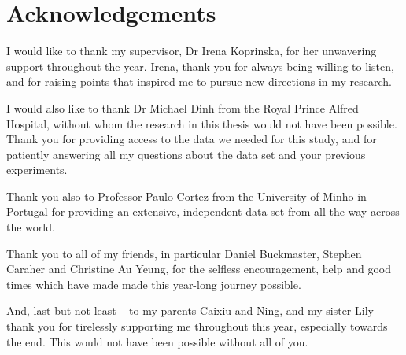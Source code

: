 \chapter*{Acknowledgements}

I would like to thank my supervisor, Dr Irena Koprinska, for her unwavering
support throughout the year. Irena, thank you for always being willing to
listen, and for raising points that inspired me to pursue new directions in
my research.

I would also like to thank Dr Michael Dinh from the Royal Prince Alfred
Hospital, without whom the research in this thesis would not have been
possible. Thank you for providing access to the data we needed for this study,
and for patiently answering all my questions about the data set and your
previous experiments.

Thank you also to Professor Paulo Cortez from the University of Minho in
Portugal for providing an extensive, independent data set from all the way
across the world.

Thank you to all of my friends, in particular Daniel Buckmaster, Stephen
Caraher and Christine Au Yeung, for the selfless encouragement, help and good
times which have made made this year-long journey possible.

And, last but not least -- to my parents Caixiu and Ning, and
my sister Lily -- thank you for tirelessly supporting me throughout this year,
especially towards the end. This would not have been possible without all of
you.
